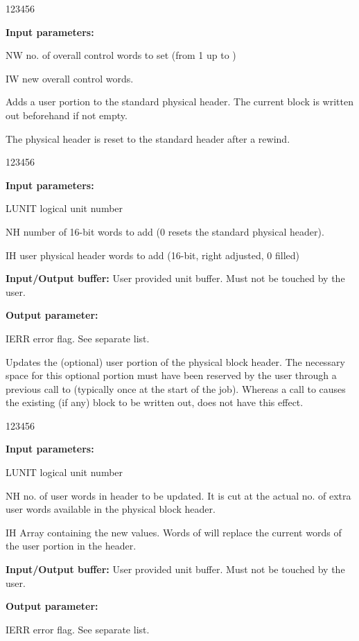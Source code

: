 \begin{DLtt}{123456}
\item[{\rm\bf Input parameters:}]
\item[NW] no. of overall control words to set (from 1 up to )
\item[IW] new overall control words.
\end{DLtt}


 
Adds a user portion to the standard physical header. The current block
is written out beforehand if not empty.
 
The physical header is reset to the standard header after a rewind.

\begin{DLtt}{123456}
\item[{\rm\bf Input parameters:}]
\item[LUNIT] logical unit number
\item[NH]  number of 16-bit words to add (0 resets the standard physical header).
\item[IH]  user physical header words to add (16-bit, right adjusted, 0 filled)
\item[{\rm\bf Input/Output buffer:}]
      User provided unit buffer. Must not be touched by the user.
\item[{\rm\bf Output parameter:}]
\item[IERR] error flag. See separate list.
\end{DLtt}

 
Updates the (optional) user portion of the physical block header.
The necessary space for this optional portion must have been reserved
by the user through a previous call to  (typically once at the
start of the job). Whereas a call to  causes the existing (if
any) block to be written out,  does not have this effect.

\begin{DLtt}{123456}
\item[{\rm\bf Input parameters:}]
\item[LUNIT] logical unit number
\item[NH] no. of user words in header to be updated.
          It is cut at the actual no. of extra user words available in the
          physical block header.
\item[IH] Array containing the new values.
          Words  of  will replace the current words 
           of the user portion in the header.
\item[{\rm\bf Input/Output buffer:}]
      User provided unit buffer. Must not be touched by the user.
\item[{\rm\bf Output parameter:}]
\item[IERR] error flag. See separate list.
\end{DLtt}

